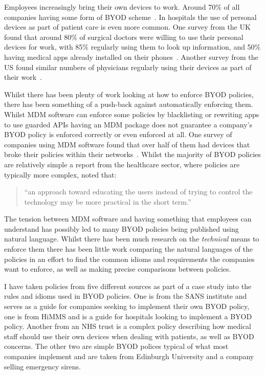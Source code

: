 \documentclass[a4paper]{scrartcl}
\begin{document}
Employees increasingly bring their own devices to work. Around 70\% of all
companies having some form of \ac{BYOD} scheme~\cite{schulze_byod_2016}. In
hospitals the use of personal devices as part of patient care is even more
common. One survey from the UK found that around 80\% of surgical doctors were
willing to use their personal devices for work, with 85\% regularly using them
to look up information, and 50\% having medical apps already installed on their
phones~\cite{patel_uk_2015}. Another survey from the US found similar numbers of
physicians regularly using their devices as part of their
work~\cite{moyer_managing_2013}.

Whilst there has been plenty of work looking at how to enforce BYOD policies,
there has been something of a push-back against automatically enforcing them.
Whilst \ac{MDM} software can enforce some policies by blacklisting or rewriting
apps to use guarded APIs having an \ac{MDM} package does not guarantee a
company's BYOD policy is enforced correctly or even enforced at all.  One survey of
companies using \ac{MDM} software found that over half of them had devices that
broke their policies within their
networks~\cite{mobileiron_security_labs_q4_2015}.
Whilst the majority of BYOD policies are relatively simple a report from the
healthcare sector, where policies are typically more complex, noted that:

\begin{quote}
  ``an approach toward educating the users instead of trying to control the
  technology may be more practical in the short term.''~\cite{moyer_managing_2013}
\end{quote}

The tension between \ac{MDM} software and having something that employees can
understand has possibly led to many BYOD policies being published using natural
language. Whilst there has been much research on the \emph{technical} means to
enforce them there has been little work comparing the natural languages of the
policies in an effort to find the common idioms and requirements the companies
want to enforce, as well as making precise comparisons between policies.

I have taken policies from five different sources as part of a case study into
the rules and idioms used in BYOD policies.  One is from the SANS
institute and serves as a guide for companies seeking to implement their own
BYOD policy, one is from HiMMS and is a guide for hospitals looking to implement
a BYOD policy.  Another from an NHS trust is a complex policy describing
how medical staff should use their own devices when dealing with patients, as
well as BYOD concerns.  The other two are simple BYOD polices typical of what
most companies implement and are taken from Edinburgh University and a company
selling emergency sirens.
\end{document}
